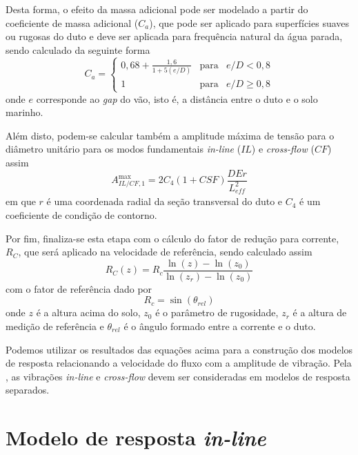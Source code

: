 Desta forma, o efeito da massa adicional pode ser modelado a partir do coeficiente de massa adicional ($C_a$), que pode ser aplicado para superfícies suaves ou rugosas do duto e deve ser aplicada para frequência natural da água parada, sendo calculado da seguinte forma
\begin{equation}
\label{eq:viv-Ca}
C_a = \left\{
\begin{matrix}
	0,68 + \frac{1,6}{1 + 5 (e/D)} & \mathrm{para} & e/D < 0,8 \\
	1                              & \mathrm{para} & e/D \geq 0,8
\end{matrix}
\right.
\end{equation}
onde $e$ corresponde ao \textit{gap} do vão, isto é, a distância entre o duto e o solo marinho.

Além disto, podem-se calcular também a amplitude máxima de tensão para o diâmetro unitário para os modos fundamentais \textit{in-line} ($\mathit{IL}$) e \textit{cross-flow} ($\mathit{CF}$) assim
\begin{equation}
\label{eq:viv-Ailcf}
A_{\mathit{IL}/\mathit{CF}, 1}^\mathrm{max} = 2 C_4(1 + \mathit{CSF})\frac{D E r}{L_\mathit{eff}^2}
\end{equation}
em que $r$ é uma coordenada radial da seção transversal do duto e $C_4$ é um coeficiente de condição de contorno.


Por fim, finaliza-se esta etapa com o cálculo do fator de redução para corrente, $R_C$, que será aplicado na velocidade de referência, sendo calculado assim
\begin{equation}
\label{eq:viv-R_C}
R_C(z) = R_c \frac{\ln(z)-\ln(z_0)}{\ln(z_r)-\ln(z_0)}
\end{equation}
com o fator de referência dado por
\begin{equation}
\nonumber
R_c = \sin(\theta_\mathit{rel})
\end{equation}
onde $z$ é a altura acima do solo, $z_0$ é o parâmetro de rugosidade, $z_r$ é a altura de medição de referência e $\theta_\mathit{rel}$ é o ângulo formado entre a corrente e o duto.

Podemos utilizar os resultados das equações acima para a construção dos modelos de resposta relacionando a velocidade do fluxo com a amplitude de vibração.
Pela , as vibrações \textit{in-line} e \textit{cross-flow} devem ser consideradas em modelos de resposta separados.


\section{Modelo de resposta \textit{in-line}}
\label{sec:modelo-resposta-inline}

